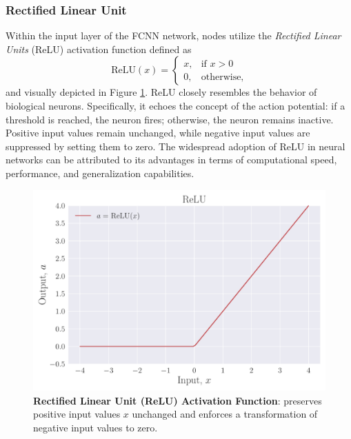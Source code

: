 \documentclass[a4paper, UKenglish, 11pt]{uiomaster}
\begin{document}
\subsubsection{Rectified Linear Unit}
Within the input layer of the FCNN network, nodes utilize the \emph{Rectified Linear Units} (ReLU) activation function
defined as
\begin{equation}
  \text{ReLU}(x) = \begin{cases}
  x, & \text{if } x > 0 \\
  0, & \text{otherwise,}
\end{cases}
\label{eq:ReLU}
\end{equation}
and visually depicted in Figure \ref{fig:ReLU}.
ReLU closely resembles the behavior  of biological neurons. Specifically, it echoes the concept of the action potential: if a threshold is reached, the neuron fires; otherwise, the neuron remains inactive. Positive input values remain unchanged, while negative input values are suppressed by setting them to zero.
The widespread adoption of ReLU in neural networks can be attributed to its advantages in terms of computational speed, performance, and generalization capabilities.
\begin{figure}[ht]
    \centering
    \includegraphics[width=\linewidth]{figures/ReLU.pdf}
    \caption{\textbf{Rectified Linear Unit (ReLU) Activation Function}: preserves positive input values \(x\) unchanged and enforces a transformation of negative input values to zero.}
    \label{fig:ReLU}
\end{figure}
\end{document}
